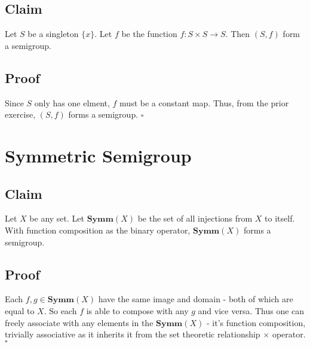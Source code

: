 \documentclass{article}
\begin{document}
\subsection{Claim}
Let $S$ be a singleton $\{x\}$.
Let $f$ be the function $ f: S \times S \to S$.
Then $(S,f)$ form a semigroup.
\subsection{Proof}
Since $S$ only has one elment, $f$ must be a constant map.
Thus, from the prior exercise, $(S,f)$ forms a semigroup.
$\square$	
	
\section{Symmetric Semigroup}
\subsection{Claim}
Let $X$ be any set.
Let $\textbf{Symm}(X)$ be the set of all injections from $X$ to itself.
With function composition as the binary operator, $\textbf{Symm}(X)$ forms a semigroup.
\subsection{Proof}
Each $f, g \in \textbf{Symm}(X)$ have the same image and domain - both of which are equal to $X$.
So each $f$ is able to compose with any $g$ and vice versa.
Thus one can freely associate with any elements in the $\textbf{Symm}(X)$ - it's function composition, trivially associative as it inherits it from the set theoretic relationship $\times$ operator.
$\square$
\end{document}

